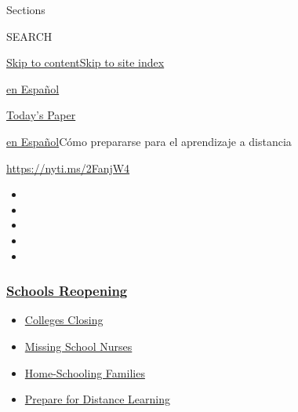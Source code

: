 Sections

SEARCH

\protect\hyperlink{site-content}{Skip to
content}\protect\hyperlink{site-index}{Skip to site index}

\href{https://www.nytimes3xbfgragh.onion/es/}{en Español}

\href{https://myaccount.nytimes3xbfgragh.onion/auth/login?response_type=cookie\&client_id=vi}{}

\href{https://www.nytimes3xbfgragh.onion/section/todayspaper}{Today's
Paper}

\href{/es/}{en Español}\textbar{}Cómo prepararse para el aprendizaje a
distancia

\url{https://nyti.ms/2FanjW4}

\begin{itemize}
\item
\item
\item
\item
\item
\end{itemize}

\hypertarget{schools-reopening}{%
\subsubsection{\texorpdfstring{\href{https://www.nytimes3xbfgragh.onion/spotlight/schools-reopening?name=styln-coronavirus-schools-reopening\&region=TOP_BANNER\&variant=undefined\&block=storyline_menu_recirc\&action=click\&pgtype=Article\&impression_id=cb35c740-e38b-11ea-8aa7-fb86b0867258}{Schools
Reopening}}{Schools Reopening}}\label{schools-reopening}}

\begin{itemize}
\tightlist
\item
  \href{https://www.nytimes3xbfgragh.onion/2020/08/19/us/colleges-closing-covid.html?name=styln-coronavirus-schools-reopening\&region=TOP_BANNER\&variant=undefined\&block=storyline_menu_recirc\&action=click\&pgtype=Article\&impression_id=cb35c741-e38b-11ea-8aa7-fb86b0867258}{Colleges
  Closing}
\item
  \href{https://www.nytimes3xbfgragh.onion/2020/08/20/us/schools-reopening-nurses-covid.html?name=styln-coronavirus-schools-reopening\&region=TOP_BANNER\&variant=undefined\&block=storyline_menu_recirc\&action=click\&pgtype=Article\&impression_id=cb35c742-e38b-11ea-8aa7-fb86b0867258}{Missing
  School Nurses}
\item
  \href{https://www.nytimes3xbfgragh.onion/2020/08/18/parenting/homeschool-families.html?name=styln-coronavirus-schools-reopening\&region=TOP_BANNER\&variant=undefined\&block=storyline_menu_recirc\&action=click\&pgtype=Article\&impression_id=cb35ee50-e38b-11ea-8aa7-fb86b0867258}{Home-Schooling
  Families}
\item
  \href{https://www.nytimes3xbfgragh.onion/2020/08/05/parenting/parents-distance-learning.html?name=styln-coronavirus-schools-reopening\&region=TOP_BANNER\&variant=undefined\&block=storyline_menu_recirc\&action=click\&pgtype=Article\&impression_id=cb35ee51-e38b-11ea-8aa7-fb86b0867258}{Prepare
  for Distance Learning}
\end{itemize}

